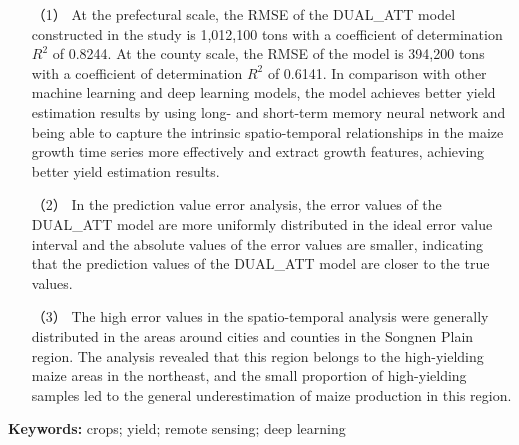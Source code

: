 \begin{itemize}
  \item [（1）] At the prefectural scale, the RMSE of the DUAL\_ATT model constructed in the study is 1,012,100 tons with a coefficient of determination $R^2$ of 0.8244. At the county scale, the RMSE of the model is 394,200 tons with a coefficient of determination $R^2$ of 0.6141. In comparison with other machine learning and deep learning models, the model achieves better yield estimation results by using long- and short-term memory neural network and being able to capture the intrinsic spatio-temporal relationships in the maize growth time series more effectively and extract growth features, achieving better yield estimation results.
  \item [（2）] In the prediction value error analysis, the error values of the DUAL\_ATT model are more uniformly distributed in the ideal error value interval and the absolute values of the error values are smaller, indicating that the prediction values of the DUAL\_ATT model are closer to the true values.
  \item [（3）] The high error values in the spatio-temporal analysis were generally distributed in the areas around cities and counties in the Songnen Plain region. The analysis revealed that this region belongs to the high-yielding maize areas in the northeast, and the small proportion of high-yielding samples led to the general underestimation of maize production in this region.
\end{itemize}

\par \textbf{Keywords:} crops; yield; remote sensing; deep learning